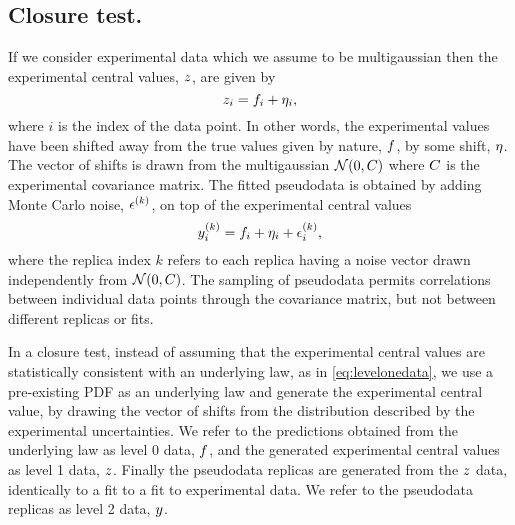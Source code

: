 \subsection{Closure test.}

If we consider experimental data which we assume
to be multigaussian then the experimental central values, $z$, are given by
\begin{equation}\label{eq:levelonedata}
    z_{i} = f_i + \eta_i,
\end{equation}
where $i$ is the index of the data point.
In other words, the experimental values have been shifted away from the true
values given by nature, $f$, by some shift, $\eta$. The vector of shifts
is drawn from
the multigaussian $\mathcal{N}(0, C)$ where $C$ is the experimental
covariance matrix. The fitted pseudodata is obtained by adding Monte Carlo
noise, $\epsilon^{(k)}$, on top of the experimental central values
\begin{equation}
    y^{(k)}_{i} = f_i + \eta_i + \epsilon^{(k)}_{i},
\end{equation}
where the replica index $k$ refers to each replica having a noise vector drawn
independently from $\mathcal{N}(0, C)$. The sampling of pseudodata permits
correlations between individual data points through the covariance matrix,
but not between different replicas or fits.

In a closure test, instead of assuming that the experimental central values are
statistically consistent with an underlying law, as in \eqref{eq:levelonedata},
we use a pre-existing PDF as an underlying law and generate the experimental
central value, by drawing the vector of shifts from the distribution
described by the experimental uncertainties. We refer to the predictions
obtained from the underlying law as level 0 data, $f$, and the generated
experimental central values as level 1 data, $z$. Finally the pseudodata
replicas are generated from the $z$ data, identically to a fit to
a fit to experimental data. We refer to the pseudodata replicas as level 2
data, $y$.


